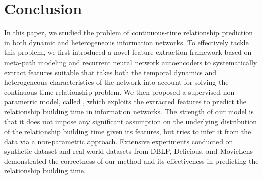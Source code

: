\section{Conclusion}\label{sec:conclusion}
In this paper, we studied the problem of continuous-time relationship prediction in both dynamic and heterogeneous information networks. To effectively tackle this problem, we first introduced a novel feature extraction framework based on meta-path modeling and recurrent neural network autoencoders to systematically extract features suitable that takes both the temporal dynamics and heterogeneous characteristics of the network into account for solving the continuous-time relationship problem. We then proposed a supervised non-parametric model, called \npglm, which exploits the extracted features to predict the relationship building time in information networks. The strength of our model is that it does not impose any significant assumption on the underlying distribution of the relationship building time given its features, but tries to infer it from the data via a non-parametric approach. Extensive experiments conducted on synthetic dataset and real-world datasets from DBLP, Delicious, and MovieLens demonstrated the correctness of our method and its effectiveness in predicting the relationship building time.\\